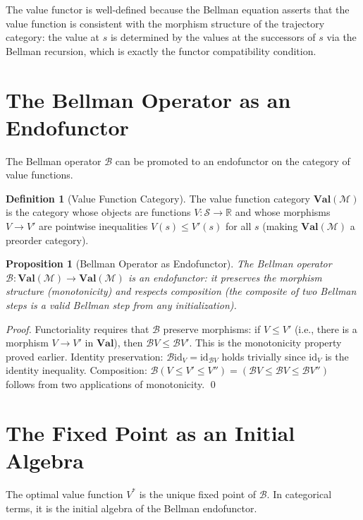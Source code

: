 \documentclass[12pt, a4paper, openany]{book}
\theoremstyle{plain}
\newtheorem{proposition}[theorem]{Proposition}
\theoremstyle{definition}
\newtheorem{definition}[theorem]{Definition}
\theoremstyle{remark}
\newcommand{\BellmanOp}{\mathcal{B}}
\begin{document}
The value functor is well-defined because the Bellman equation asserts that the value function is consistent with the morphism structure of the trajectory category: the value at $s$ is determined by the values at the successors of $s$ via the Bellman recursion, which is exactly the functor compatibility condition.

\section{The Bellman Operator as an Endofunctor}

The Bellman operator $\BellmanOp$ can be promoted to an endofunctor on the category of value functions.

\begin{definition}[Value Function Category]
The value function category $\mathbf{Val}(\mathcal{M})$ is the category whose objects are functions $V: \mathcal{S} \to \mathbb{R}$ and whose morphisms $V \to V'$ are pointwise inequalities $V(s) \leq V'(s)$ for all $s$ (making $\mathbf{Val}(\mathcal{M})$ a preorder category).
\end{definition}

\begin{proposition}[Bellman Operator as Endofunctor]
The Bellman operator $\BellmanOp: \mathbf{Val}(\mathcal{M}) \to \mathbf{Val}(\mathcal{M})$ is an endofunctor: it preserves the morphism structure (monotonicity) and respects composition (the composite of two Bellman steps is a valid Bellman step from any initialization).
\end{proposition}

\begin{proof}
Functoriality requires that $\BellmanOp$ preserve morphisms: if $V \leq V'$ (i.e., there is a morphism $V \to V'$ in $\mathbf{Val}$), then $\BellmanOp V \leq \BellmanOp V'$. This is the monotonicity property proved earlier. Identity preservation: $\BellmanOp \mathrm{id}_V = \mathrm{id}_{\BellmanOp V}$ holds trivially since $\mathrm{id}_V$ is the identity inequality. Composition: $\BellmanOp(V \leq V' \leq V'') = (\BellmanOp V \leq \BellmanOp V \leq \BellmanOp V'')$ follows from two applications of monotonicity. \qed
\end{proof}

\section{The Fixed Point as an Initial Algebra}

The optimal value function $V^*$ is the unique fixed point of $\BellmanOp$. In categorical terms, it is the initial algebra of the Bellman endofunctor.
\end{document}
